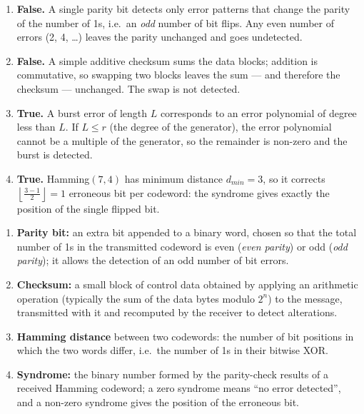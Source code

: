 \documentclass[11pt]{article}
\begin{document}
\begin{corrige}
\begin{enumerate}
\item \textbf{False.} A single parity bit detects only error patterns that change the parity of the number of 1s, i.e.\ an \emph{odd} number of bit flips. Any even number of errors (2, 4, \dots) leaves the parity unchanged and goes undetected.
\item \textbf{False.} A simple additive checksum sums the data blocks; addition is commutative, so swapping two blocks leaves the sum — and therefore the checksum — unchanged. The swap is not detected.
\item \textbf{True.} A burst error of length $L$ corresponds to an error polynomial of degree less than $L$. If $L \leq r$ (the degree of the generator), the error polynomial cannot be a multiple of the generator, so the remainder is non-zero and the burst is detected.
\item \textbf{True.} Hamming$(7,4)$ has minimum distance $d_{min}=3$, so it corrects $\left\lfloor \frac{3-1}{2}\right\rfloor = 1$ erroneous bit per codeword: the syndrome gives exactly the position of the single flipped bit.
\end{enumerate}
\end{corrige}

\begin{corrige}
\begin{enumerate}
\item \textbf{Parity bit:} an extra bit appended to a binary word, chosen so that the total number of 1s in the transmitted codeword is even (\emph{even parity}) or odd (\emph{odd parity}); it allows the detection of an odd number of bit errors.
\item \textbf{Checksum:} a small block of control data obtained by applying an arithmetic operation (typically the sum of the data bytes modulo $2^n$) to the message, transmitted with it and recomputed by the receiver to detect alterations.
\item \textbf{Hamming distance} between two codewords: the number of bit positions in which the two words differ, i.e.\ the number of 1s in their bitwise XOR.
\item \textbf{Syndrome:} the binary number formed by the parity-check results of a received Hamming codeword; a zero syndrome means ``no error detected'', and a non-zero syndrome gives the position of the erroneous bit.
\end{enumerate}
\end{corrige}
\end{document}
